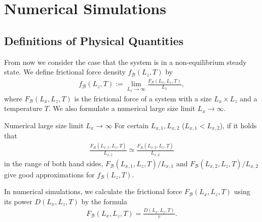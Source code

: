 \chapter{Numerical Simulations}

\section{Definitions of Physical Quantities}

From now we consider the case that the system is in a non-equilibrium steady state. We define frictional force density $f_{\mathcal{B}}(L_{z}, T)$ by
\begin{align}
f_{\mathcal{B}}(L_{z}, T):=\lim_{L_{x}\to\infty}\frac{F_{\mathcal{B}}(L_{x}, L_{z}, T)}{L_{x}},
\end{align}
where $F_{\mathcal{B}}(L_{x}, L_{z}, T)$ is the frictional force of a system with a size $L_{x}\times L_{z}$ and a temperature $T$. We also formulate a numerical large size limit $L_{x}\to\infty$.
\begin{itembox}{Numerical large size limit $L_{x}\to\infty$}
	For certain $L_{x, 1}, L_{x, 2}$ ($L_{x, 1} < L_{x, 2}$), if it holds that
	\begin{align}
	\frac{F_{\mathcal{B}}(L_{x, 1}, L_{z}, T)}{L_{x, 1}}\simeq \frac{F_{\mathcal{B}}(L_{x, 2}, L_{z}, T)}{L_{x, 2}}
	\end{align}
	in the range of both hand sides, $F_{\mathcal{B}}(L_{x, 1}, L_{z}, T)/L_{x, 1}$ and $F_{\mathcal{B}}(L_{x, 2}, L_{z}, T)/L_{x, 2}$ give good approximations for $f_{\mathcal{B}}(L_{z}, T)$.
\end{itembox}

In numerical simulations, we calculate the frictional force $F_{\mathcal{B}}(L_{x}, L_{z}, T)$ using its power $D(L_{x}, L_{z}, T)$ by the formula
\begin{align}
F_{\mathcal{B}}(L_{x}, L_{z}, T)=\frac{D(L_{x}, L_{z}, T)}{v}\label{for:frictionalforce}.
\end{align}

